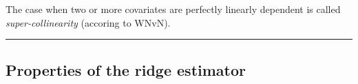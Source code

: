 \documentclass[
  letterpaper,
  DIV=11,
  numbers=noendperiod]{scrartcl}
\begin{document}
The case when two or more covariates are perfectly linearly dependent is
called \emph{super-collinearity} (accoring to WNvN).

\begin{center}\rule{0.5\linewidth}{0.5pt}\end{center}

\hypertarget{properties-of-the-ridge-estimator}{%
\subsection{Properties of the ridge
estimator}\label{properties-of-the-ridge-estimator}}

\begin{figure}

\begin{minipage}[t]{0.50\linewidth}

{\centering 


}

\end{minipage}%
%
\begin{minipage}[t]{0.50\linewidth}

{\centering 


}

\end{minipage}%

\end{figure}
\end{document}
